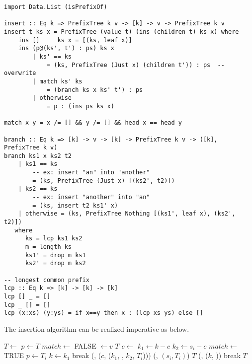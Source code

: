 \documentclass{article}
\begin{document}
\lstset{language=Haskell}
\begin{lstlisting}
import Data.List (isPrefixOf)

insert :: Eq k => PrefixTree k v -> [k] -> v -> PrefixTree k v
insert t ks x = PrefixTree (value t) (ins (children t) ks x) where
    ins []     ks x = [(ks, leaf x)]
    ins (p@(ks', t') : ps) ks x
        | ks' == ks
            = (ks, PrefixTree (Just x) (children t')) : ps  -- overwrite
        | match ks' ks
            = (branch ks x ks' t') : ps
        | otherwise
            = p : (ins ps ks x)

match x y = x /= [] && y /= [] && head x == head y

branch :: Eq k => [k] -> v -> [k] -> PrefixTree k v -> ([k], PrefixTree k v)
branch ks1 x ks2 t2
    | ks1 == ks
        -- ex: insert "an" into "another"
        = (ks, PrefixTree (Just x) [(ks2', t2)])
    | ks2 == ks
        -- ex: insert "another" into "an"
        = (ks, insert t2 ks1' x)
    | otherwise = (ks, PrefixTree Nothing [(ks1', leaf x), (ks2', t2)])
   where
      ks = lcp ks1 ks2
      m = length ks
      ks1' = drop m ks1
      ks2' = drop m ks2

-- longest common prefix
lcp :: Eq k => [k] -> [k] -> [k]
lcp [] _ = []
lcp _ [] = []
lcp (x:xs) (y:ys) = if x==y then x : (lcp xs ys) else []
\end{lstlisting}

The insertion algorithm can be realized imperative as below.

\begin{algorithmic}[1]
   \State $T \gets$ 
  \EndIf
  \State $p \gets T$
  \Loop
    \State $match \gets$ FALSE
        \State {} $\gets v$
        \State \Return $T$
      \EndIf
      \State $c \gets$ 
      \State $k_1 \gets k - c$
      \State $k_2 \gets s_i - c$
        \State $match \gets$ TRUE
         
          \State $p \gets T_i$
          \State $k \gets k_1$
          \State break
        \Else {}
          \State {}(, ($c$, ($k_1$, , $k_2$, $T_i$)))
          \State {}(, $(s_i, T_i)$)
          \State \Return $T$
        \EndIf
      \EndIf
    \EndFor
     
      \State {}(, ($k$, ))
      \State break
    \EndIf
  \EndLoop
  \State \Return $T$
\EndFunction
\end{algorithmic}
\end{document}
